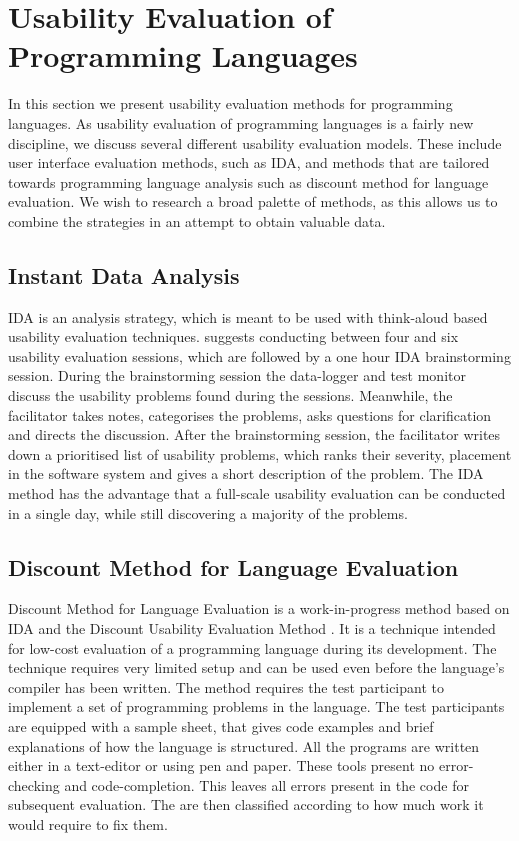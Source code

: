 \section{Usability Evaluation of Programming Languages} \label{sec:prog-usability}
In this section we present usability evaluation methods for programming languages. As usability evaluation of programming languages is a fairly new discipline, we discuss several different usability evaluation models. These include user interface evaluation methods, such as \gls{IDA}, and methods that are tailored towards programming language analysis such as discount method for language evaluation. We wish to research a broad palette of methods, as this allows us to combine the strategies in an attempt to obtain valuable data.

\subsection{Instant Data Analysis} \label{sec:ida}
\gls{IDA} is an analysis strategy, which is meant to be used with think-aloud based usability evaluation techniques\cite{kjeldskov2004instant}. \cite{kjeldskov2004instant} suggests conducting between four and six usability evaluation sessions, which are followed by a one hour \gls{IDA} brainstorming session. During the brainstorming session the data-logger and test monitor discuss the usability problems found during the sessions. Meanwhile, the facilitator takes notes, categorises the problems, asks questions for clarification and directs the discussion. After the brainstorming session, the facilitator writes down a prioritised list of usability problems, which ranks their severity, placement in the software system and gives a short description of the problem. The \gls{IDA} method has the advantage that a full-scale usability evaluation can be conducted in a single day, while still discovering a majority of the problems\cite{kjeldskov2004instant}.

\subsection{Discount Method for Language Evaluation} \label{sec:discount-method}
Discount Method for Language Evaluation is a work-in-progress method based on \gls{IDA}\cite{kurtev2016discount} and the Discount Usability Evaluation Method \cite{benyon2014designing}. It is a technique intended for low-cost evaluation of a programming language during its development. The technique requires very limited setup and can be used even before the language's compiler has been written. The method requires the test participant to implement a set of programming problems in the language. The test participants are equipped with a sample sheet, that gives code examples and brief explanations of how the language is structured. All the programs are written either in a text-editor or using pen and paper. These tools present no error-checking and code-completion. This leaves all errors present in the code for subsequent evaluation. The are then classified according to how much work it would require to fix them.

